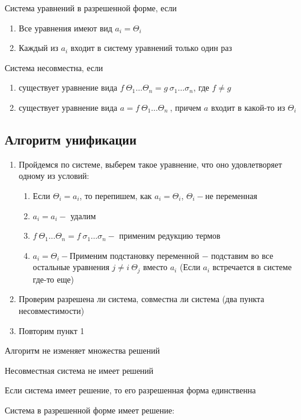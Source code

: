 		\begin{definition}Система уравнений в разрешенной форме, если \end{definition}
			\begin{enumerate}
				\item Все уравнения имеют вид $a_i=\Theta_i$
				\item Каждый из $a_i$ входит в систему уравнений только один раз
			\end{enumerate}
		\begin{definition}Система несовместна, если\end{definition}
		\begin{enumerate}
			\item существует уравнение вида $f\:\Theta_1\hdots\Theta_n=g\:\sigma_1\hdots\sigma_n$, где $f\neq g$
			\item существует уравнение вида $a=f\:\Theta_1\hdots\Theta_n\:$, причем $a$ входит в какой-то из $\Theta_i$
		\end{enumerate}			

    \subsection{ Алгоритм унификации}
		\begin{enumerate}
		\item Пройдемся по системе, выберем такое уравнение, что оно удовлетворяет одному из условий:\begin{enumerate}
			\item Если $\Theta_i=a_i$, то перепишем, как $a_i=\Theta_i$, $\Theta_i-$не переменная
			\item $a_i=a_i-$ удалим
			\item $f\:\Theta_1\hdots\Theta_n=f\:\sigma_1\hdots\sigma_n-$  применим редукцию термов 
			\item $a_i=\Theta_i-$Применим подстановку переменной $-$ подставим во все остальные уравнения $j \neq i\ \Theta_j$ вместо $a_i$ (Если $a_i$ встречается в системе где-то еще)
		\end{enumerate}
		\item Проверим разрешена ли система, совместна ли система (два пункта несовместимости)
		\item Повторим пункт 1 		
		\end{enumerate}

		\begin{statement} Алгоритм не изменяет множества решений\end{statement}
		\begin{statement} Несовместная система не имеет решений\end{statement}
		\begin{statement} Если система имеет решение, то его разрешенная форма единственна\end{statement}
		\begin{statement} Система в разрешенной форме имеет решение:\end{statement}	
		

